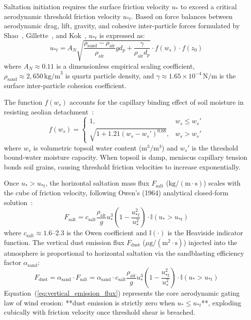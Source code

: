 Saltation initiation requires the surface friction velocity $u_*$ to exceed a critical aerodynamic threshold friction velocity $u_{*t}$. Based on force balances between aerodynamic drag, lift, gravity, and cohesive inter-particle forces formulated by Shao~\cite{shao2008physics}, Gillette~\cite{gillette1979environmental}, and Kok~\cite{kok2012physics}, $u_{*t}$ is expressed as:
\begin{equation}
\label{eq:threshold_friction_velocity}
u_{*t} = A_N \sqrt{\frac{\rho_{\text{sand}} - \rho_{\text{air}}}{\rho_{\text{air}}} g d_p + \frac{\gamma}{\rho_{\text{air}} d_p}} \cdot f(w_s) \cdot f(z_0)
\end{equation}
where $A_N \approx 0.11$ is a dimensionless empirical scaling coefficient, $\rho_{\text{sand}} \approx 2{,}650\,\text{kg/m}^3$ is quartz particle density, and $\gamma \approx 1.65 \times 10^{-4}\,\text{N/m}$ is the surface inter-particle cohesion coefficient.

The function $f(w_s)$ accounts for the capillary binding effect of soil moisture in resisting aeolian detachment~\cite{ref13}:
\begin{equation}
\label{eq:moisture_inhibition}
f(w_s) = 
\begin{cases}
1, & w_s \le w_s' \\
\sqrt{1 + 1.21 \left(w_s - w_s'\right)^{0.68}}, & w_s > w_s'
\end{cases}
\end{equation}
where $w_s$ is volumetric topsoil water content ($\text{m}^3/\text{m}^3$) and $w_s'$ is the threshold bound-water moisture capacity. When topsoil is damp, meniscus capillary tension bonds soil grains, causing threshold friction velocities to increase exponentially.

Once $u_* > u_{*t}$, the horizontal saltation mass flux $F_{\text{salt}}$ ($\text{kg}/(\text{m}\cdot\text{s})$) scales with the cube of friction velocity, following Owen's (1964) analytical closed-form solution~\cite{owen1964saltation}:
\begin{equation}
\label{eq:owen_flux}
F_{\text{salt}} = c_{\text{salt}} \frac{\rho_{\text{air}}}{g} u_*^3 \left(1 - \frac{u_{*t}^2}{u_*^2}\right) \cdot \mathbb{I}(u_* > u_{*t})
\end{equation}
where $c_{\text{salt}} \approx 1.6\text{--}2.3$ is the Owen coefficient and $\mathbb{I}(\cdot)$ is the Heaviside indicator function. The vertical dust emission flux $F_{\text{dust}}$ ($\mu\text{g}/(\text{m}^2\cdot\text{s})$) injected into the atmosphere is proportional to horizontal saltation via the sandblasting efficiency factor $\alpha_{\text{sand}}$:
\begin{equation}
\label{eq:vertical_emission_flux}
F_{\text{dust}} = \alpha_{\text{sand}} \cdot F_{\text{salt}} = \alpha_{\text{sand}} \cdot c_{\text{salt}} \frac{\rho_{\text{air}}}{g} u_*^3 \left(1 - \frac{u_{*t}^2}{u_*^2}\right) \cdot \mathbb{I}(u_* > u_{*t})
\end{equation}
Equation~(\ref{eq:vertical_emission_flux}) represents the core aerodynamic gating law of wind erosion: **dust emission is strictly zero when $u_* \le u_{*t}$**, exploding cubically with friction velocity once threshold shear is breached.

